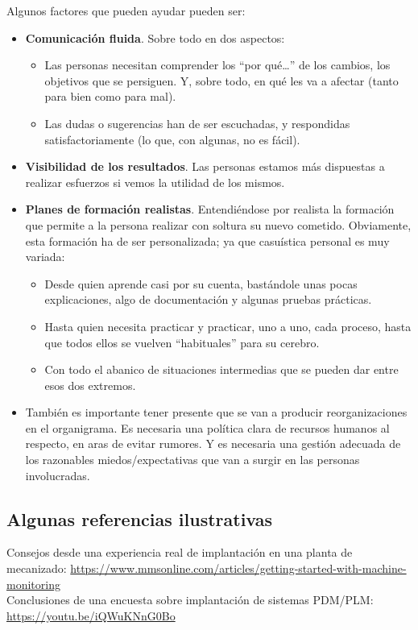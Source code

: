 \documentclass[spanish,12pt,a4paper,final,oneside]{book}
\begin{document}
Algunos factores que pueden ayudar pueden ser:
\begin{itemize}

\item \textbf{Comunicación fluida}. Sobre todo en dos aspectos:
  \begin{itemize}
  \item Las personas necesitan comprender los ``por qué\ldots'' de los cambios, los objetivos que se persiguen. Y, sobre todo, en qué les va a afectar (tanto para bien como para mal).
  \item Las dudas o sugerencias han de ser escuchadas, y respondidas satisfactoriamente (lo que, con algunas, no es fácil).
  \end{itemize}

\item \textbf{Visibilidad de los resultados}. Las personas estamos más dispuestas a realizar esfuerzos si vemos la utilidad de los mismos.

\item \textbf{Planes de formación realistas}. Entendiéndose por realista la formación que permite a la persona realizar con soltura su nuevo cometido. Obviamente, esta formación ha de ser personalizada; ya que casuística personal es muy variada:
  \begin{itemize}
  \item Desde quien aprende casi por su cuenta, bastándole unas pocas explicaciones, algo de documentación y algunas pruebas prácticas.
  \item Hasta quien necesita practicar y practicar, uno a uno, cada proceso, hasta que todos ellos se vuelven ``habituales'' para su cerebro.
  \item Con todo el abanico de situaciones intermedias que se pueden dar entre esos dos extremos.
  \end{itemize}
  
\item También es importante tener presente que se van a producir reorganizaciones en el organigrama. Es necesaria una política clara de recursos humanos al respecto, en aras de evitar rumores. Y es necesaria una gestión adecuada de los razonables miedos/expectativas que van a surgir en las personas involucradas.

\end{itemize}
  

\subsection*{Algunas referencias ilustrativas}
Consejos desde una experiencia real de implantación en una planta de mecanizado: \url{https://www.mmsonline.com/articles/getting-started-with-machine-monitoring}
\\ Conclusiones de una encuesta sobre implantación de sistemas PDM/PLM: \url{https://youtu.be/iQWuKNnG0Bo}
\end{document}

